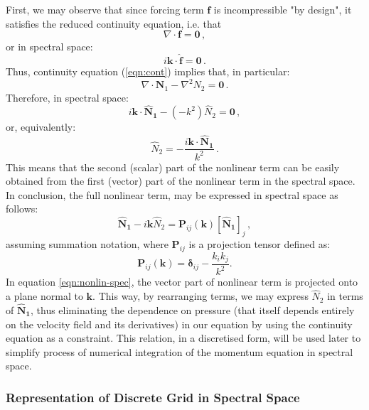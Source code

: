 \documentclass{pracamgren}
\begin{document}
First, we may observe that since forcing term $\mathbf{f}$ is incompressible "by design", it satisfies the reduced continuity equation, i.e. that
$$ \nabla \cdot \mathbf{f} = \mathbf{0} \, , $$
or in spectral space:
$$ i \mathbf{k} \cdot \mathbf{\hat{f}} = \mathbf{0} \, . $$
Thus, continuity equation (\ref{eqn:cont}) implies that, in particular:
$$ \nabla \cdot \mathbf{N}_1 - \nabla^2 N_2 = \mathbf{0} \, . $$
Therefore, in spectral space:
$$ i \mathbf{k} \cdot \mathbf{\hat{N}_1} - (-k^2) \hat{N}_2 = \mathbf{0} \, , $$
or, equivalently:
$$ \hat{N}_2 = - \frac{i \mathbf{k} \cdot \mathbf{\hat{N}_1} }{k^2} \,. $$
This means that the second (scalar) part of the nonlinear term can be easily obtained from the first (vector) part of the nonlinear term in the spectral space.
In conclusion, the full nonlinear term, may be expressed in spectral space as follows:
\begin{equation}
\label{eqn:nonlin-spec}
\mathbf{\hat{N}_1} - i \mathbf{k} \hat{N}_2 = \mathbf{P}_{ij}( \mathbf{k} ) \left[ \mathbf{\hat{N}_1} \right]_{j} \, ,
\end{equation}
assuming summation notation, where $\mathbf{P}_{ij}$ is a projection tensor defined as:
\begin{equation}
\label{eqn:proj-tensor}
\mathbf{P}_{ij}( \mathbf{k} ) = \mathbf{\delta}_{ij} - \frac{k_{i} k_{j}}{k^2} .
\end{equation}
In equation \ref{eqn:nonlin-spec}, the vector part of nonlinear term is projected onto a plane normal to $\mathbf{k}$.
This way, by rearranging terms, we may express $\hat{N}_2$ in terms of $\mathbf{\hat{N}_1}$, thus eliminating the dependence on pressure (that itself depends entirely on the velocity field and its derivatives) in our equation by using the continuity equation as a constraint. 
This relation, in a discretised form, will be used later to simplify process of numerical integration of the momentum equation in spectral space.


\subsubsection{Representation of Discrete Grid in Spectral Space}
\end{document}

